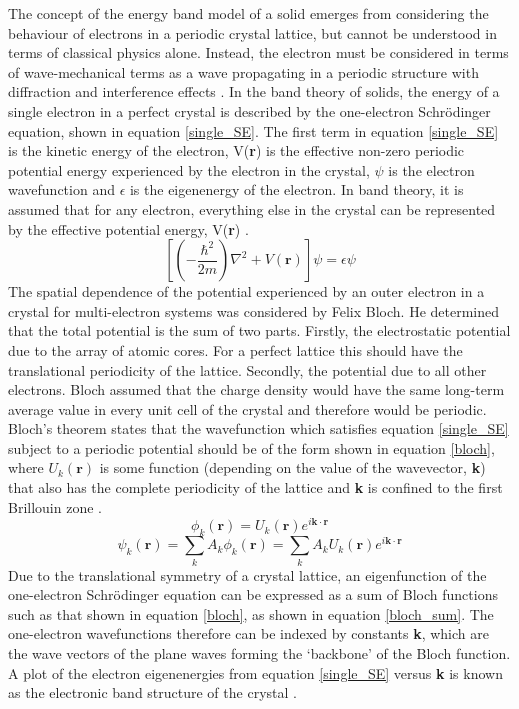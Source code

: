 The concept of the energy band model of a solid emerges from considering the behaviour of electrons in a periodic crystal lattice, but cannot be understood in terms of classical physics alone. Instead, the electron must be considered in terms of wave-mechanical terms as a wave propagating in a periodic structure with diffraction and interference effects  \cite{small_semiconductor1}.
In the band theory of 
solids, the energy of a single electron in a perfect crystal is described by the one-electron Schr{\"o}dinger equation, shown in equation \ref{single_SE}. The first term in equation \ref{single_SE} is the kinetic 
energy of the electron, V(\textbf{r}) is the effective non-zero periodic potential energy experienced by 
the electron in the crystal, $\psi$ is the electron wavefunction and  $\epsilon$ is the eigenenergy of the electron. In band theory, it is assumed that for any electron, everything else in the crystal can be represented by the effective potential energy, V(\textbf{r}) \cite{Blakemore2}.
\begin{equation} \label{single_SE}
\left[ \left(-\frac{\hbar^2}{2m}\right)\nabla^2 + V(\mathbf{r})\right]\psi = \epsilon \psi 
\end{equation}
The spatial dependence of the potential experienced by an outer electron in a crystal for multi-electron systems was considered by Felix Bloch. He determined that the total potential is the sum of two parts. Firstly, the electrostatic potential due to the array of atomic cores. For a perfect lattice this should have the translational periodicity of the lattice. Secondly, the potential due to all other electrons. Bloch assumed that the charge density would have the same long-term average value in every unit cell of the crystal and therefore would be periodic. Bloch's theorem states that the wavefunction which satisfies equation \ref{single_SE} subject to a periodic potential should be of the form shown in equation \ref{bloch}, where $U_k(\mathbf{r})$ is some function 
(depending on the value of the wavevector, \textbf{k}) that also has the complete 
periodicity of the lattice and \textbf{k} is confined to the first Brillouin zone \cite{Blakemore2}.
\begin{equation} \label{bloch}
\phi_k(\mathbf{r}) = U_k(\mathbf{r}) e^{i\mathbf{k \cdot r}} 
\end{equation}
\begin{equation} \label{bloch_sum}
\psi_k(\mathbf{r}) = \sum_k A_k \phi_k(\mathbf{r}) = \sum_k A_kU_k(\mathbf{r}) e^{i\mathbf{k \cdot r}} 
\end{equation}
Due to the translational symmetry of a crystal lattice, an eigenfunction of the one-electron Schr{\"o}dinger equation can be expressed as a sum of Bloch functions such as that shown in equation \ref{bloch}, as shown in equation \ref{bloch_sum}. The one-electron wavefunctions therefore can be indexed by constants \textbf{k}, which are the wave vectors of the plane waves forming the `backbone' of the Bloch function. A plot of the electron eigenenergies from equation \ref{single_SE} versus \textbf{k} is known as the electronic band structure of the crystal \cite{fund_semi}.

